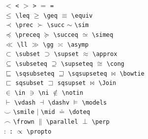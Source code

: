 \begin{table}[!htbp]
\caption[Relationen]%
        {Relationen (\footnotemark[1] ben"otigt Paket \texttt{latexsym})}
\begin{symbols}
$< $\> \verb|<| \>$>$\> \verb|>| \>$=$\> \verb|=| \\
$\leq $\> \verb|\leq| \>$\geq $\> \verb|\geq| \>$\equiv $\> \verb|\equiv| \\
$\prec $\> \verb|\prec| \>$\succ $\> \verb|\succ| \>$\sim $\> \verb|\sim| \\
$\preceq $\> \verb|\preceq| \>$\succeq $\> \verb|\succeq| \>
$\simeq $\> \verb|\simeq| \\
$\ll $\> \verb|\ll| \>$\gg $\> \verb|\gg| \>$\asymp $\> \verb|\asymp| \\
$\subset $\> \verb|\subset| \>$\supset $\> \verb|\supset| \>
$\approx $\> \verb|\approx| \\
$\subseteq $\> \verb|\subseteq| \>$\supseteq $\> \verb|\supseteq| \>
$\cong $\> \verb|\cong| \\
$\sqsubseteq $\> \verb|\sqsubseteq| \>$\sqsupseteq $\> \verb|\sqsupseteq| \>
$\bowtie $\> \verb|\bowtie| \\
$\sqsubset$ \> \verb|sqsubset|\footnotemark[1]\>
$\sqsupset$ \> \verb|sqsupset|\footnotemark[1]\>
$\Join$\> \verb|\Join|\footnotemark[1] \\
$\in $\> \verb|\in| \>$\ni $\> \verb|\ni| \>
$\notin$ \> \verb|\notin| \\
$\vdash $\> \verb|\vdash| \>$\dashv $\> \verb|\dashv| \>
$\models $\> \verb|\models| \\
$\smile $\> \verb|\smile| \>$\mid $\> \verb|\mid| \>
$\doteq $\> \verb|\doteq| \\
$\frown $\> \verb|\frown| \>$\parallel $\> \verb|\parallel| \>
$\perp $\> \verb|\perp| \\
$:$ \> \verb|:| \> $\propto$ \> \verb|\propto| \\
\end{symbols}
\end{table}

